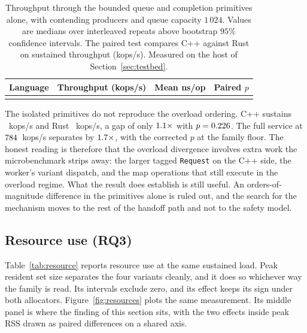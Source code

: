 \documentclass[english,oneside,a4paper,censored,csm,software-track-2020]{HYthesisML}
\begin{document}
\begin{table}[H]
\centering
\small
\caption[Throughput through the contended synchronisation primitives alone]{Throughput through
the bounded queue and completion primitives alone, with \ContentionProducers{} contending producers
and queue capacity $1\,024$. Values are medians over \ContentionRepeats{} interleaved repeats above
bootstrap $95\%$ confidence intervals. The paired test compares C++ against Rust on sustained
throughput (kops/s). Measured on the host of Section~\ref{sec:testbed}.\label{tab:contention}}
\begin{tabular}{@{}l r r r@{}}
\hline\hline
Language & Throughput (kops/s) & Mean ns/op & Paired $p$ \\
\hline
\\
\hline
\end{tabular}
\end{table}

The isolated primitives do not reproduce the overload ordering. C++ sustains
\ContentionThrCpp{}~kops/s and Rust \ContentionThrRust{}~kops/s, a gap of only
$1.1\times$ with $p = 0.226$. The full service at
$784$~kops/s separates by $1.7\times$, with the corrected $p$ at the
family floor. The honest reading is therefore that the overload divergence involves extra
work the microbenchmark strips away: the larger tagged \texttt{Request} on the C++ side, the
worker's variant dispatch, and the map operations that still execute in the overload regime.
What the result does establish is still useful. An orders-of-magnitude difference in the primitives
alone is ruled out, and the search for the mechanism moves to the rest of the handoff path and not
to the safety model.

\subsection{Resource use (RQ3)}\label{sec:resources}
Table~\ref{tab:resource} reports resource use at the same
sustained load. Peak resident set size separates the four variants cleanly, and it does so
whichever way the family is read. Its intervals exclude zero, and its effect keeps its sign under
both allocators. Figure~\ref{fig:resources} plots the same measurement. Its middle panel is
where the finding of this section sits, with the two effects inside peak RSS drawn as paired
differences on a shared axis.
\end{document}
